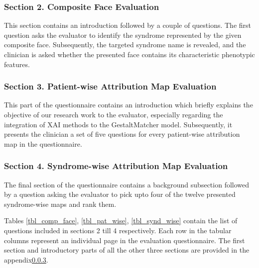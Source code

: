 \documentclass[../report.tex]{subfiles}
\begin{document}
    
   \subsubsection{Section 2. Composite Face Evaluation}
   This section contains an introduction followed by a couple of questions. The first question asks the evaluator to identify the syndrome represented by the given composite face. Subsequently, the targeted syndrome name is revealed, and the clinician is asked whether the presented face contains its characteristic phenotypic features.
    
   \subsubsection{Section 3. Patient-wise Attribution Map Evaluation}
   This part of the questionnaire contains an introduction which briefly explains the objective of our research work to the evaluator, especially regarding the integration of XAI methods to the GestaltMatcher model. Subsequently, it presents the clinician a set of five questions for every patient-wise attribution map in the questionnaire.
   \subsubsection{Section 4. Syndrome-wise Attribution Map Evaluation}
   The final section of the questionnaire contains a background subsection followed by a question asking the evaluator to pick upto four of the twelve presented syndrome-wise maps and rank them.
   
   Tables \ref{tbl_comp_face}, \ref{tbl_pat_wise}, \ref{tbl_synd_wise} contain the list of questions included in sections 2 till 4 respectively. Each row in the tabular columns represent an individual page in the evaluation questionnaire. The first section and introductory parts of all the other three sections are provided in the appendix\ref{}.
  
\end{document}
